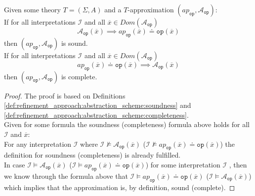 \begin{lemma}
    \label{lemma:refinement_approach:abstraction_scheme:implication}
    Given some theory $T=\left(\Sigma,A\right)$ and a $T$-approximation $\left(ap_{\texttt{op}}, \mathcal{A}_{\texttt{op}}\right)$:\\
    If for all interpretations $\mathcal{I}$ and all $\overline{x}\in Dom\left(\mathcal{A}_{\texttt{op}}\right)$
    \[
        \mathcal{A}_{\texttt{op}}\left(\overline{x}\right) \implies ap_{\texttt{op}}\left(\overline{x}\right) \doteq \texttt{op}\left(\overline{x}\right)
    \]
    then $\left(ap_{\texttt{op}}, \mathcal{A}_{\texttt{op}}\right)$ is sound.\\
    If for all interpretations $\mathcal{I}$ and all $\overline{x}\in Dom\left(\mathcal{A}_{\texttt{op}}\right)$
    \[
        ap_{\texttt{op}}\left(\overline{x}\right) \doteq \texttt{op}\left(\overline{x}\right) \implies \mathcal{A}_{\texttt{op}}\left(\overline{x}\right)
    \]
    then $\left(ap_{\texttt{op}}, \mathcal{A}_{\texttt{op}}\right)$ is complete.
    \begin{proof}
        The proof is based on Definitions \ref{def:refinement_approach:abstraction_scheme:soundness} and \ref{def:refinement_approach:abstraction_scheme:completeness}.\\
        Given for some formula the soundness (completeness) formula above holds for all $\mathcal{I}$ and $\overline{x}$:\\
        For any interpretation $\mathcal{I}$ where
            $\mathcal{I}\nvDash\mathcal{A}_{\texttt{op}}\left(\overline{x}\right)$
            ($\mathcal{I}\nvDash ap_{\texttt{op}}\left(\overline{x}\right) \doteq \texttt{op}\left(\overline{x}\right)$)
            the definition for soundness (completeness) is already fulfilled.\\
        In case
            $\mathcal{I}\vDash\mathcal{A}_{\texttt{op}}\left(\overline{x}\right)$
            ($\mathcal{I}\vDash ap_{\texttt{op}}\left(\overline{x}\right) \doteq \texttt{op}\left(\overline{x}\right)$) for some interpretation $\mathcal{I}$  ,
        then we know through the formula above that
            $\mathcal{I}\vDash ap_{\texttt{op}}\left(\overline{x}\right) \doteq \texttt{op}\left(\overline{x}\right)$
            ($\mathcal{I}\vDash\mathcal{A}_{\texttt{op}}\left(\overline{x}\right)$)
        which implies that the approximation is, by definition, sound (complete).


    \end{proof}
\end{lemma}

